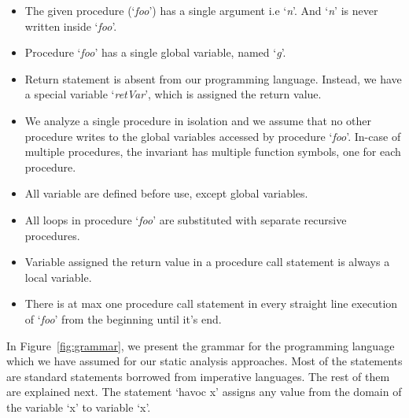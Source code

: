 \documentclass{llncs}
\newcommand{\foo}{\textit{foo}}
\newcommand{\retVar}{\textit{retVar}}
\newcommand{\n}{\textit{n}}
\newcommand{\g}{\textit{g}}
\begin{document}
\begin{itemize}
\item The given procedure (`\foo') has a single argument i.e `\n'. And
  `\n' is never written inside `\foo'.
\item Procedure `\foo' has a single global variable, named `\g'.
\item Return statement is absent from our programming language. Instead,
  we have a special variable `\retVar', which is assigned the return
  value.
\item We analyze a single procedure in isolation and we assume that no
  other procedure writes to the global variables accessed by procedure
  `\foo'. In-case of multiple procedures, the invariant has multiple
  function symbols, one for each procedure. 
\item All variable are defined before use, except global variables.
\item All loops in procedure `\foo' are substituted with 
  separate recursive procedures.
\item Variable assigned the return value in a procedure call
  statement is always a local variable.
\item There is at max one procedure call statement in every straight line
  execution of `\foo' from the beginning until it's end.
  \end{itemize}

In Figure~\ref{fig:grammar}, we present the grammar for the
programming language which we have assumed for our static analysis
approaches.  Most of the statements are standard statements borrowed
from imperative languages. The rest of them are explained next. The
statement `havoc x' assigns any value from the domain of the variable
`x' to variable `x'.
\end{document}
